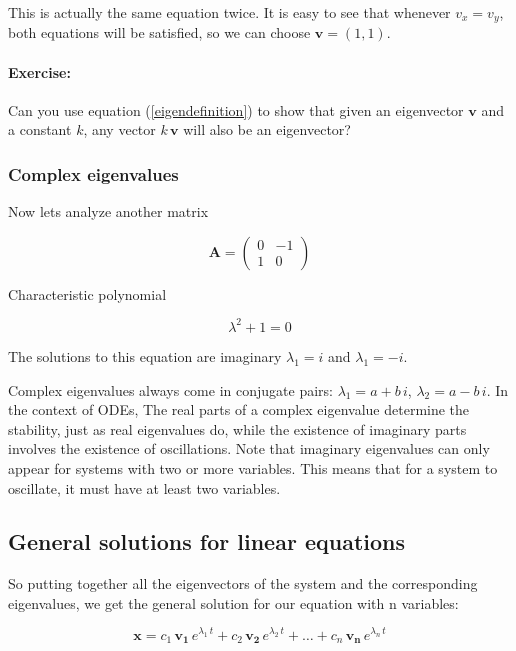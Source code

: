 \documentclass[12pt]{article}
\begin{document}
This is actually the same equation twice. It is easy to see that whenever $v_x=v_y$, both equations will be satisfied, so we can choose $\mathbf{v} = (1, 1)$.

\paragraph{Exercise:} Can you use equation (\ref{eigendefinition}) to show that given an eigenvector $\mathbf{v}$ and a constant $k$, any vector $k \, \mathbf{v}$ will also be an eigenvector?

\subsubsection{Complex eigenvalues}

Now lets analyze another matrix 

\begin{equation}
	\mathbf{A}  = \begin{pmatrix} 0 & -1\\ 1 & 0\end{pmatrix}  \nonumber
\end{equation}

Characteristic polynomial

\begin{equation}
	\lambda^2 + 1 = 0 \nonumber
\end{equation}

The solutions to this equation are imaginary $\lambda_1 = i$ and $\lambda_1 = -i$.

Complex eigenvalues always come in conjugate pairs: $\lambda_1 = a + b\, i$,  $\lambda_2 = a - b\, i$. In the context of ODEs, The real parts of a complex eigenvalue determine the stability, just as real eigenvalues do, while the existence of imaginary parts involves the existence of oscillations. Note that imaginary eigenvalues can only appear for systems with two or more variables. This means that for a system to oscillate, it must have at least two variables.


\subsection{General solutions for linear equations}

So putting together all the eigenvectors of the system and the corresponding eigenvalues, we get the general solution for our equation with n variables:


\begin{equation}
	\label{odenvar_mat_sol}
	\mathbf{x}= c_1 \, \mathbf{v_1} \, e^{\lambda_1 \, t} + c_2 \, \mathbf{v_2} \, e^{\lambda_2 \, t} +  \dots + c_n \, \mathbf{v_n} \, e^{\lambda_n \, t} 
\end{equation}
\end{document}
